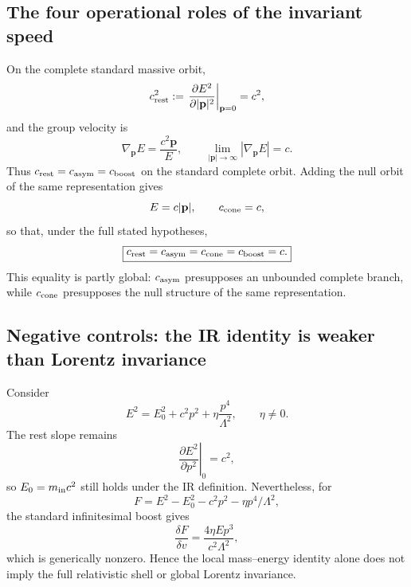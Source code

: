 \documentclass[11pt,a4paper]{article}
\begin{document}
\subsection{The four operational roles of the invariant speed}
On the complete standard massive orbit,
\begin{equation}
c_{\rm rest}^2
:=\left.\frac{\partial E^2}{\partial |\mathbf p|^2}\right|_{\mathbf p=0}
=c^2,
\end{equation}
and the group velocity is
\begin{equation}
\nabla_{\mathbf p}E=\frac{c^2\mathbf p}{E},
\qquad
\lim_{|\mathbf p|\to\infty}|\nabla_{\mathbf p}E|=c.
\end{equation}
Thus $c_{\rm rest}=c_{\rm asym}=c_{\rm boost}$ on the standard complete orbit.  Adding the null orbit of the same representation gives
\begin{equation}
E=c|\mathbf p|,
\qquad c_{\rm cone}=c,
\end{equation}
so that, under the full stated hypotheses,
\begin{equation}
\boxed{c_{\rm rest}=c_{\rm asym}=c_{\rm cone}=c_{\rm boost}=c.}
\label{eq:fourcs}
\end{equation}
This equality is partly global: $c_{\rm asym}$ presupposes an unbounded complete branch, while $c_{\rm cone}$ presupposes the null structure of the same representation.

\subsection{Negative controls: the IR identity is weaker than Lorentz invariance}
Consider
\begin{equation}
E^2=E_0^2+c^2p^2+\eta\frac{p^4}{\Lambda^2},
\qquad \eta\neq0.
\label{eq:quarticLV}
\end{equation}
The rest slope remains
\begin{equation}
\left.\frac{\partial E^2}{\partial p^2}\right|_0=c^2,
\end{equation}
so $E_0=m_{\rm in}c^2$ still holds under the IR definition.  Nevertheless, for
\begin{equation}
F=E^2-E_0^2-c^2p^2-\eta p^4/\Lambda^2,
\end{equation}
the standard infinitesimal boost gives
\begin{equation}
\frac{\delta F}{\delta v}
=\frac{4\eta Ep^3}{c^2\Lambda^2},
\end{equation}
which is generically nonzero.  Hence the local mass--energy identity alone does not imply the full relativistic shell or global Lorentz invariance.
\end{document}
